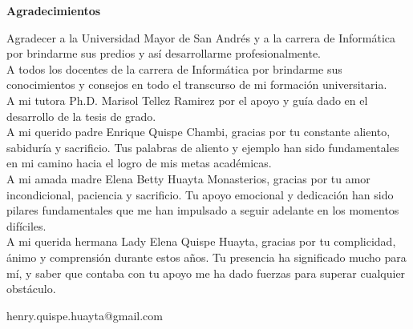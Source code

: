 \begin{center}
  \Large \textbf{Agradecimientos}
\end{center}
Agradecer a la Universidad Mayor de San Andrés y a la carrera de Informática por brindarme sus predios y así desarrollarme profesionalmente. \\
A todos los docentes de la carrera de Informática por brindarme sus conocimientos y consejos en todo el transcurso de mi formación universitaria. \\
A mi tutora Ph.D. Marisol Tellez Ramirez por el apoyo y guía dado en el desarrollo de la tesis de grado. \\
A mi querido padre Enrique Quispe Chambi, gracias por tu constante aliento, sabiduría y sacrificio. Tus palabras de aliento y ejemplo han sido fundamentales en mi camino hacia el logro de mis metas académicas. \\
A mi amada madre Elena Betty Huayta Monasterios, gracias por tu amor incondicional, paciencia y sacrificio. Tu apoyo emocional y dedicación han sido pilares fundamentales que me han impulsado a seguir adelante en los momentos difíciles. \\
A mi querida hermana Lady Elena Quispe Huayta, gracias por tu complicidad, ánimo y comprensión durante estos años. Tu presencia ha significado mucho para mí, y saber que contaba con tu apoyo me ha dado fuerzas para superar cualquier obstáculo. \\
\begin{flushright}
  henry.quispe.huayta@gmail.com
\end{flushright}